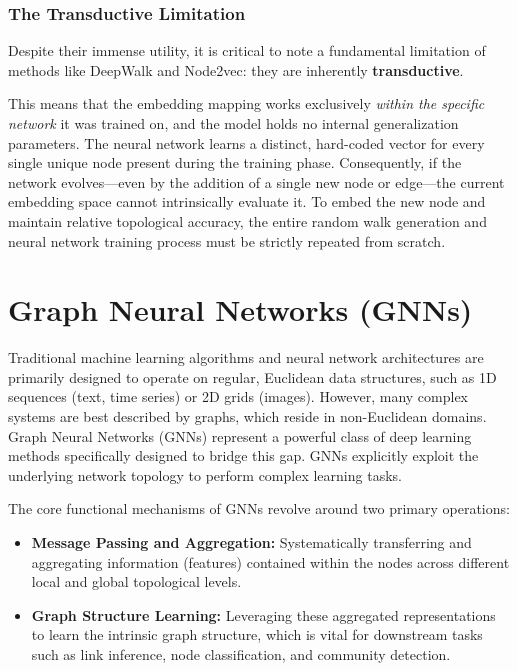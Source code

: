 \subsubsection{The Transductive Limitation}

Despite their immense utility, it is critical to note a fundamental limitation of methods like DeepWalk and Node2vec: they are inherently \textbf{transductive}.

This means that the embedding mapping works exclusively \textit{within the specific network} it was trained on, and the model holds no internal generalization parameters. The neural network learns a distinct, hard-coded vector for every single unique node present during the training phase. Consequently, if the network evolves—even by the addition of a single new node or edge—the current embedding space cannot intrinsically evaluate it. To embed the new node and maintain relative topological accuracy, the entire random walk generation and neural network training process must be strictly repeated from scratch.

\section{Graph Neural Networks (GNNs)}
\label{sec:graph_neural_networks}

Traditional machine learning algorithms and neural network architectures are primarily designed to operate on regular, Euclidean data structures, such as 1D sequences (text, time series) or 2D grids (images). However, many complex systems are best described by graphs, which reside in non-Euclidean domains. Graph Neural Networks (GNNs) represent a powerful class of deep learning methods specifically designed to bridge this gap. GNNs explicitly exploit the underlying network topology to perform complex learning tasks.

The core functional mechanisms of GNNs revolve around two primary operations:
\begin{itemize}
    \item \textbf{Message Passing and Aggregation:} Systematically transferring and aggregating information (features) contained within the nodes across different local and global topological levels.
    \item \textbf{Graph Structure Learning:} Leveraging these aggregated representations to learn the intrinsic graph structure, which is vital for downstream tasks such as link inference, node classification, and community detection.
\end{itemize}

